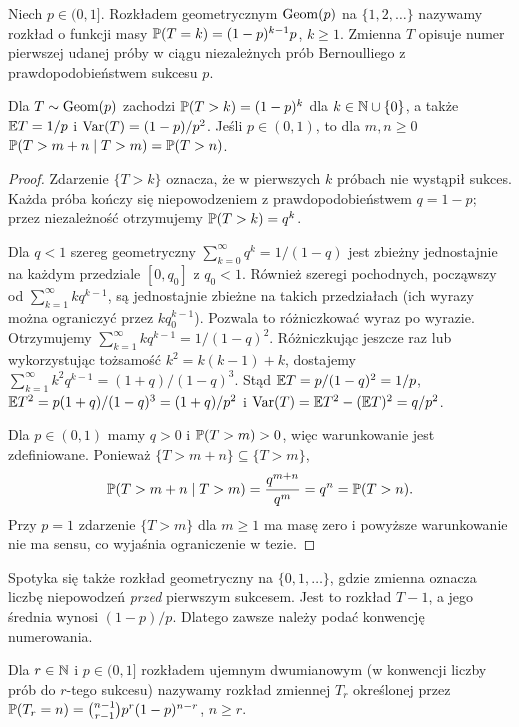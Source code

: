 \begin{definicja}
Niech $p\in(0,1]$. Rozkładem geometrycznym $\operatorname{Geom}(p)$
na $\{1,2,\ldots\}$ nazywamy rozkład o funkcji masy
$\mathbb{P}(T=k)=(1-p)^{k-1}p$, $k\geq1$.
Zmienna $T$ opisuje numer pierwszej udanej próby
w ciągu niezależnych prób Bernoulliego z prawdopodobieństwem sukcesu $p$.
\end{definicja}

\begin{stwierdzenie}
Dla $T\sim\operatorname{Geom}(p)$ zachodzi $\mathbb{P}(T>k)=(1-p)^k$ dla
$k\in\mathbb{N}\cup\{0\}$, a także
$\mathbb{E} T=1/p$ i $\operatorname{Var}(T)=(1-p)/p^2$.
Jeśli $p\in(0,1)$, to dla $m,n\geq0$
$\mathbb{P}(T>m+n\mid T>m)=\mathbb{P}(T>n)$.
\end{stwierdzenie}
\begin{proof}
Zdarzenie $\{T>k\}$ oznacza, że w pierwszych $k$
próbach nie wystąpił sukces. Każda próba kończy się
niepowodzeniem z prawdopodobieństwem $q=1-p$;
przez niezależność otrzymujemy
$\mathbb{P}(T>k)=q^k$.

Dla $q<1$ szereg geometryczny
$\sum_{k=0}^\infty q^k=1/(1-q)$ jest zbieżny
jednostajnie na każdym przedziale $[0,q_0]$ z $q_0<1$.
Również szeregi pochodnych, począwszy od
$\sum_{k=1}^\infty kq^{k-1}$, są jednostajnie zbieżne
na takich przedziałach (ich wyrazy można ograniczyć przez
$kq_0^{k-1}$). Pozwala to różniczkować wyraz po wyrazie.
Otrzymujemy
$\sum_{k=1}^\infty kq^{k-1}=1/(1-q)^2$.
Różniczkując jeszcze raz lub wykorzystując tożsamość
$k^2=k(k-1)+k$, dostajemy
$\sum_{k=1}^\infty k^2q^{k-1}=(1+q)/(1-q)^3$.
Stąd
$\mathbb{E} T=p/(1-q)^2=1/p$,
$\mathbb{E} T^2=p(1+q)/(1-q)^3=(1+q)/p^2$
i $\operatorname{Var}(T)=\mathbb{E} T^2-(\mathbb{E} T)^2=q/p^2$.

Dla $p\in(0,1)$ mamy $q>0$ i
$\mathbb{P}(T>m)>0$, więc warunkowanie jest zdefiniowane.
Ponieważ $\{T>m+n\}\subseteq\{T>m\}$,
\[
\mathbb{P}(T>m+n\mid T>m)
=\frac{q^{m+n}}{q^m}=q^n=\mathbb{P}(T>n).
\]
Przy $p=1$ zdarzenie $\{T>m\}$ dla $m\geq1$
ma masę zero i powyższe warunkowanie nie ma sensu,
co wyjaśnia ograniczenie w tezie.
\end{proof}

\begin{uwaga}
Spotyka się także rozkład geometryczny na $\{0,1,\ldots\}$,
gdzie zmienna oznacza liczbę niepowodzeń \emph{przed} pierwszym sukcesem.
Jest to rozkład $T-1$, a jego średnia wynosi $(1-p)/p$.
Dlatego zawsze należy podać konwencję numerowania.
\end{uwaga}

\begin{definicja}
Dla $r\in\mathbb{N}$ i $p\in(0,1]$ rozkładem ujemnym dwumianowym
(w konwencji liczby prób do $r$-tego sukcesu) nazywamy rozkład
zmiennej $T_r$ określonej przez
$\mathbb{P}(T_r=n)=\binom{n-1}{r-1}p^r(1-p)^{n-r}$, $n\geq r$.
\end{definicja}

